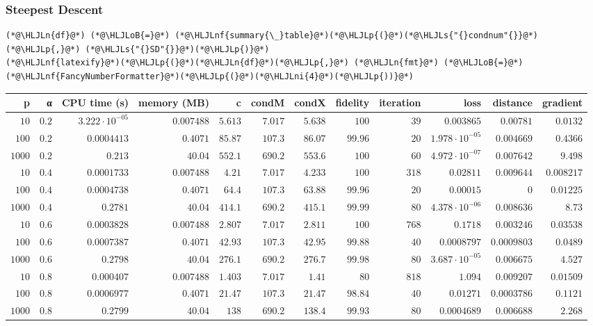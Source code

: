 \documentclass[12pt,a4paper]{article}
\newcommand{\HLJLn}[1]{#1}
\newcommand{\HLJLnf}[1]{\textcolor[RGB]{66,102,213}{#1}}
\newcommand{\HLJLs}[1]{\textcolor[RGB]{201,61,57}{#1}}
\newcommand{\HLJLni}[1]{\textcolor[RGB]{59,151,46}{#1}}
\newcommand{\HLJLoB}[1]{\textcolor[RGB]{102,102,102}{\textbf{#1}}}
\newcommand{\HLJLp}[1]{#1}
\begin{document}
\subsubsection{Steepest Descent}

\begin{lstlisting}
(*@\HLJLn{df}@*) (*@\HLJLoB{=}@*) (*@\HLJLnf{summary{\_}table}@*)(*@\HLJLp{(}@*)(*@\HLJLs{"{}condnum"{}}@*)(*@\HLJLp{,}@*) (*@\HLJLs{"{}SD"{}}@*)(*@\HLJLp{)}@*)
(*@\HLJLnf{latexify}@*)(*@\HLJLp{(}@*)(*@\HLJLn{df}@*)(*@\HLJLp{,}@*) (*@\HLJLn{fmt}@*) (*@\HLJLoB{=}@*) (*@\HLJLnf{FancyNumberFormatter}@*)(*@\HLJLp{(}@*)(*@\HLJLni{4}@*)(*@\HLJLp{))}@*)
\end{lstlisting}


\begin{tabular}
{r | r | r | r | r | r | r | r | r | r | r | r}
p & α & CPU time (s) & memory (MB) & c & condM & condX & fidelity & iteration & loss & distance & gradient \\
\hline
$10$ & $0.2$ & $3.222 \cdot 10^{-05}$ & $0.007488$ & $5.613$ & $7.017$ & $5.638$ & $100$ & $39$ & $0.003865$ & $0.00781$ & $0.0132$ \\
$100$ & $0.2$ & $0.0004413$ & $0.4071$ & $85.87$ & $107.3$ & $86.07$ & $99.96$ & $20$ & $1.978 \cdot 10^{-05}$ & $0.004669$ & $0.4366$ \\
$1000$ & $0.2$ & $0.213$ & $40.04$ & $552.1$ & $690.2$ & $553.6$ & $100$ & $60$ & $4.972 \cdot 10^{-07}$ & $0.007642$ & $9.498$ \\
$10$ & $0.4$ & $0.0001733$ & $0.007488$ & $4.21$ & $7.017$ & $4.233$ & $100$ & $318$ & $0.02811$ & $0.009644$ & $0.008217$ \\
$100$ & $0.4$ & $0.0004738$ & $0.4071$ & $64.4$ & $107.3$ & $63.88$ & $99.96$ & $20$ & $0.00015$ & $0$ & $0.01225$ \\
$1000$ & $0.4$ & $0.2781$ & $40.04$ & $414.1$ & $690.2$ & $415.1$ & $99.99$ & $80$ & $4.378 \cdot 10^{-06}$ & $0.008636$ & $8.73$ \\
$10$ & $0.6$ & $0.0003828$ & $0.007488$ & $2.807$ & $7.017$ & $2.811$ & $100$ & $768$ & $0.1718$ & $0.003246$ & $0.03538$ \\
$100$ & $0.6$ & $0.0007387$ & $0.4071$ & $42.93$ & $107.3$ & $42.95$ & $99.88$ & $40$ & $0.0008797$ & $0.0009803$ & $0.0489$ \\
$1000$ & $0.6$ & $0.2798$ & $40.04$ & $276.1$ & $690.2$ & $276.7$ & $99.98$ & $80$ & $3.687 \cdot 10^{-05}$ & $0.006675$ & $4.527$ \\
$10$ & $0.8$ & $0.000407$ & $0.007488$ & $1.403$ & $7.017$ & $1.41$ & $80$ & $818$ & $1.094$ & $0.009207$ & $0.01509$ \\
$100$ & $0.8$ & $0.0006977$ & $0.4071$ & $21.47$ & $107.3$ & $21.47$ & $98.84$ & $40$ & $0.01271$ & $0.0003786$ & $0.1121$ \\
$1000$ & $0.8$ & $0.2799$ & $40.04$ & $138$ & $690.2$ & $138.4$ & $99.93$ & $80$ & $0.0004689$ & $0.006688$ & $2.268$ \\
\end{tabular}
\end{document}
